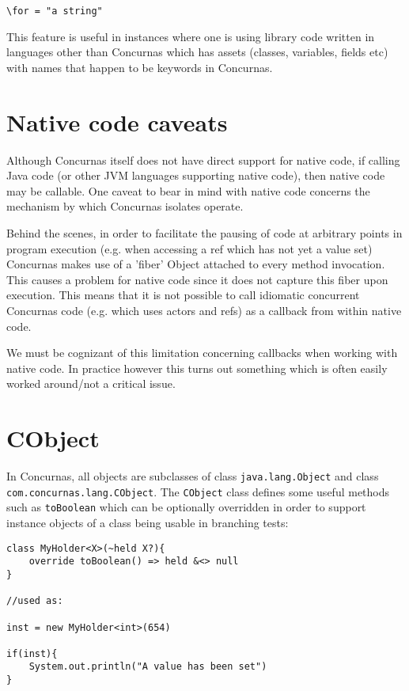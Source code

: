 \documentclass[conc-doc]{subfiles}
\begin{document}
\begin{lstlisting}
\for = "a string"
\end{lstlisting}

This feature is useful in instances where one is using library code written in languages other than Concurnas which has assets (classes, variables, fields etc) with names that happen to be keywords in Concurnas.

\section{Native code caveats}
Although Concurnas itself does not have direct support for native code, if calling Java code (or other JVM languages supporting native code), then native code may be callable. One caveat to bear in mind with native code concerns the mechanism by which Concurnas isolates operate.

Behind the scenes, in order to facilitate the pausing of code at arbitrary points in program execution (e.g. when accessing a ref which has not yet a value set) Concurnas makes use of a 'fiber' Object attached to every method invocation. This causes a problem for native code since it does not capture this fiber upon execution. This means that it is not possible to call idiomatic concurrent Concurnas code (e.g. which uses actors and refs) as a callback from within native code.

We must be cognizant of this limitation concerning callbacks when working with native code. In practice however this turns out something which is often easily worked around/not a critical issue.

\section{CObject}
In Concurnas, all objects are subclasses of class \lstinline{java.lang.Object} and class \lstinline{com.concurnas.lang.CObject}. The \lstinline{CObject} class defines some useful methods such as \lstinline{toBoolean} which can be optionally overridden in order to support instance objects of a class being usable in branching tests:

\begin{lstlisting}
class MyHolder<X>(~held X?){
	override toBoolean() => held &<> null
}

//used as:

inst = new MyHolder<int>(654)

if(inst){
	System.out.println("A value has been set")
}

\end{lstlisting}
\end{document}
